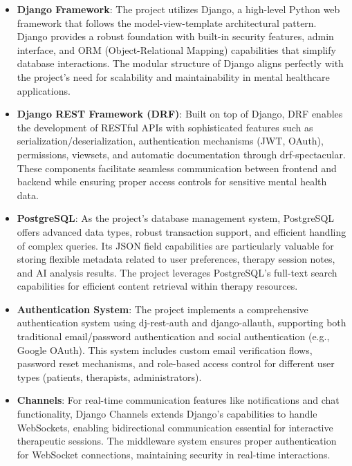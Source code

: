 \begin{itemize}
  \item \textbf{Django Framework}: The project utilizes Django, a high-level Python web framework that follows the model-view-template architectural pattern. Django provides a robust foundation with built-in security features, admin interface, and ORM (Object-Relational Mapping) capabilities that simplify database interactions. The modular structure of Django aligns perfectly with the project's need for scalability and maintainability in mental healthcare applications.
  
  \item \textbf{Django REST Framework (DRF)}: Built on top of Django, DRF enables the development of RESTful APIs with sophisticated features such as serialization/deserialization, authentication mechanisms (JWT, OAuth), permissions, viewsets, and automatic documentation through drf-spectacular. These components facilitate seamless communication between frontend and backend while ensuring proper access controls for sensitive mental health data.
  
  \item \textbf{PostgreSQL}: As the project's database management system, PostgreSQL offers advanced data types, robust transaction support, and efficient handling of complex queries. Its JSON field capabilities are particularly valuable for storing flexible metadata related to user preferences, therapy session notes, and AI analysis results. The project leverages PostgreSQL's full-text search capabilities for efficient content retrieval within therapy resources.
  
  \item \textbf{Authentication System}: The project implements a comprehensive authentication system using dj-rest-auth and django-allauth, supporting both traditional email/password authentication and social authentication (e.g., Google OAuth). This system includes custom email verification flows, password reset mechanisms, and role-based access control for different user types (patients, therapists, administrators).
  
  \item \textbf{Channels}: For real-time communication features like notifications and chat functionality, Django Channels extends Django's capabilities to handle WebSockets, enabling bidirectional communication essential for interactive therapeutic sessions. The middleware system ensures proper authentication for WebSocket connections, maintaining security in real-time interactions.
  

\end{itemize}
